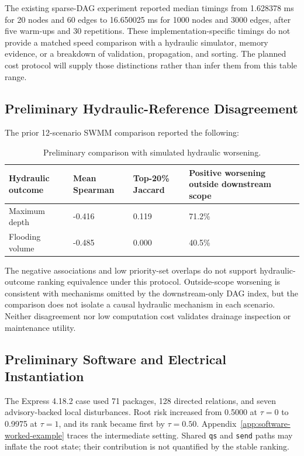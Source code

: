 The existing sparse-DAG experiment reported median timings from
1.628378 ms for 20 nodes and 60 edges to 16.650025 ms for 1000 nodes
and 3000 edges, after five warm-ups and 30 repetitions.
These implementation-specific timings do not provide a matched speed
comparison with a hydraulic simulator, memory evidence, or a breakdown
of validation, propagation, and sorting. The planned cost protocol will
supply those distinctions rather than infer them from this table range.

\subsection{Preliminary Hydraulic-Reference Disagreement}

The prior 12-scenario SWMM comparison reported the following:
\begin{table}[H]
\centering
\caption{Preliminary comparison with simulated hydraulic worsening.}
\label{tab:prelim-swmm}
\small
\begin{tabularx}{\textwidth}{@{}L*{3}{Y}@{}}
\toprule
Hydraulic outcome & Mean Spearman & Top-20\% Jaccard & Positive worsening outside downstream scope\\
\midrule
Maximum depth & -0.416 & 0.119 & 71.2\%\\
Flooding volume & -0.485 & 0.000 & 40.5\%\\
\bottomrule
\end{tabularx}
\end{table}

The negative associations and low priority-set overlaps do not support
hydraulic-outcome ranking equivalence under this protocol. Outside-scope
worsening is consistent with mechanisms omitted by the downstream-only
DAG index, but the comparison does not isolate a causal hydraulic
mechanism in each scenario. Neither disagreement nor low computation
cost validates drainage inspection or maintenance utility.

\subsection{Preliminary Software and Electrical Instantiation}

The Express 4.18.2 case used 71 packages, 128 directed relations, and
seven advisory-backed local disturbances. Root risk increased from
0.5000 at $\tau=0$ to 0.9975 at $\tau=1$, and its rank became first
by $\tau=0.50$. Appendix~\ref{app:software-worked-example} traces the
intermediate setting. Shared \texttt{qs} and \texttt{send} paths may
inflate the root state; their contribution is not quantified by the
stable ranking.

